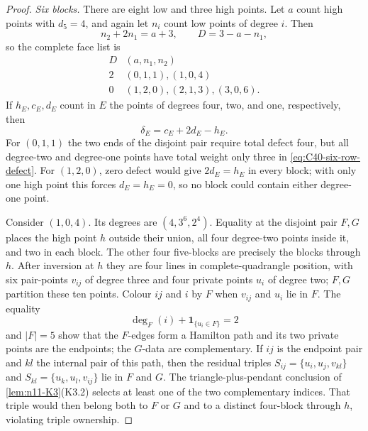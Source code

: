 \begin{proof}
\smallskip
\noindent\emph{Six blocks.}
There are eight low and three high points.  Let $a$ count high points with
$d_5=4$, and again let $n_i$ count low points of degree $i$.  Then
\[
 n_2+2n_1=a+3,\qquad D=3-a-n_1,
\]
so the complete face list is
\[
\begin{array}{c|c}
D&(a,n_1,n_2)\\ \hline
2&(0,1,1),(1,0,4)\\
0&(1,2,0),(2,1,3),(3,0,6).
\end{array}
\]
If $h_E,c_E,d_E$ count in $E$ the points of degrees four, two, and one,
respectively, then
\begin{equation}\label{eq:C40-six-row-defect}
 \delta_E=c_E+2d_E-h_E.
\end{equation}
For $(0,1,1)$ the two ends of the disjoint pair require total defect four,
but all degree-two and degree-one points have total weight only three in
\eqref{eq:C40-six-row-defect}.  For $(1,2,0)$, zero defect would give
$2d_E=h_E$ in every block; with only one high point this forces
$d_E=h_E=0$, so no block could contain either degree-one point.

Consider $(1,0,4)$.  Its degrees are $(4,3^6,2^4)$.  Equality at the
disjoint pair $F,G$ places the high point $h$ outside their union, all four
degree-two points inside it, and two in each block.  The other four
five-blocks are precisely the blocks through $h$.  After inversion at $h$
they are four lines in complete-quadrangle position, with six pair-points
$v_{ij}$ of degree three and four private points $u_i$ of degree two;
$F,G$ partition these ten points.  Colour $ij$ and $i$ by $F$ when
$v_{ij}$ and $u_i$ lie in $F$.  The equality
\[
 \deg_F(i)+\mathbf1_{\{u_i\in F\}}=2
\]
and $|F|=5$ show that the $F$-edges form a Hamilton path and its two private
points are the endpoints; the $G$-data are complementary.  If $ij$ is the
endpoint pair and $kl$ the internal pair of this path, then the residual
triples $S_{ij}=\{u_i,u_j,v_{kl}\}$ and
$S_{kl}=\{u_k,u_l,v_{ij}\}$ lie in $F$ and $G$.  The triangle-plus-pendant
conclusion of \cref{lem:n11-K3}(K3.2) selects at least one of the two
complementary indices.  That triple would then belong both to $F$ or $G$
and to a distinct four-block through $h$, violating triple ownership.


\end{proof}
